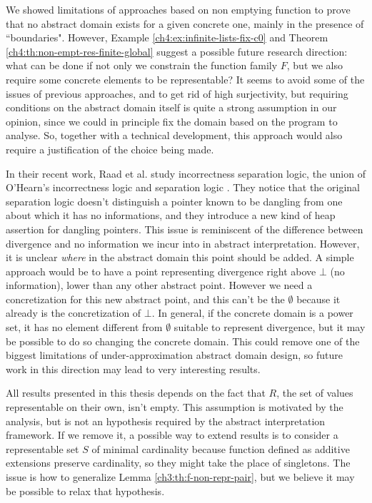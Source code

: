 We showed limitations of approaches based on non emptying function to prove that no abstract domain exists for a given concrete one, mainly in the presence of ``boundaries". However, Example \ref{ch4:ex:infinite-lists-fix-c0} and Theorem \ref{ch4:th:non-empt-res-finite-global} suggest a possible future research direction: what can be done if not only we constrain the function family $F$, but we also require some concrete elements to be representable? It seems to avoid some of the issues of previous approaches, and to get rid of high surjectivity, but requiring conditions on the abstract domain itself is quite a strong assumption in our opinion, since we could in principle fix the domain based on the program to analyse. So, together with a technical development, this approach would also require a justification of the choice being made.

In their recent work, Raad et al. \cite{incorrectness-separation-logic} study incorrectness separation logic, the union of O'Hearn's incorrectness logic and separation logic \cite{reynolds-incorrectness-logic}. They notice that the original separation logic doesn't distinguish a pointer known to be dangling from one about which it has no informations, and they introduce a new kind of heap assertion for dangling pointers. This issue is reminiscent of the difference between divergence and no information we incur into in abstract interpretation. However, it is unclear \textit{where} in the abstract domain this point should be added. A simple approach would be to have a point representing divergence right above $\bot$ (no information), lower than any other abstract point.
However we need a concretization for this new abstract point, and this can't be the $\emptyset$ because it already is the concretization of $\bot$. In general, if the concrete domain is a power set, it has no element different from $\emptyset$ suitable to represent divergence, but it may be possible to do so changing the concrete domain. This could remove one of the biggest limitations of under-approximation abstract domain design, so future work in this direction may lead to very interesting results.

All results presented in this thesis depends on the fact that $R$, the set of values representable on their own, isn't empty. This assumption is motivated by the analysis, but is not an hypothesis required by the abstract interpretation framework. If we remove it, a possible way to extend results is to consider a representable set $S$ of minimal cardinality because function defined as additive extensions preserve cardinality, so they might take the place of singletons. The issue is how to generalize Lemma \ref{ch3:th:f-non-repr-pair}, but we believe it may be possible to relax that hypothesis.

